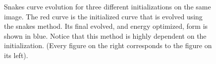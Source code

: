 \documentclass{article}
\begin{document}
\begin{figure}
{					\label{subfig:00000_snakes3_orig}
				}
			\caption{Snakes curve evolution for three different initializations on the same image.  The red curve is the initialized curve that is evolved using the snakes method.  Its final evolved, and energy optimized, form is shown in blue.  Notice that this method is highly dependent on the initialization.  (Every figure on the right corresponds to the figure on its left).} 	
			\label{fig:SnakesExperiments}	
\end{figure}	
\end{document}
